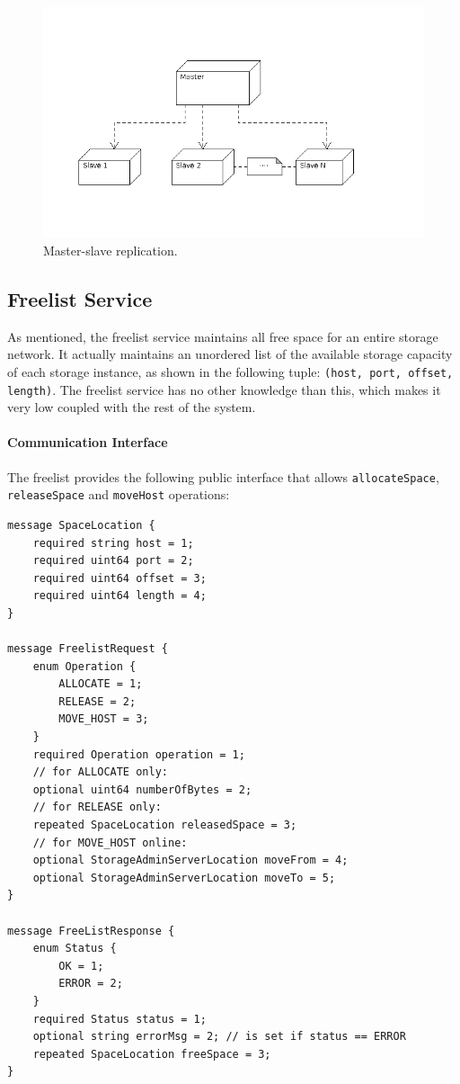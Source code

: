 \documentclass[12pt,a4paper]{scrartcl}
\begin{document}
\begin{figure}[H]
\centering
\includegraphics[width=\textwidth,trim=0 2cm 3cm 1cm,clip=true]{diagrams/MasterSlave.png} %
\caption{Master-slave replication.}
\label{fig:master-slave}
\end{figure}



\subsection{Freelist Service}
\label{sec:freelist}
As mentioned, the freelist service maintains all free space for an entire storage network. It actually maintains an unordered list of the available storage capacity of each storage instance, as shown in the following tuple: \verb|(host, port, offset, length)|. The freelist service has no other knowledge than this, which makes it very low coupled with the rest of the system.

\paragraph{Communication Interface}
The freelist provides the following public interface that allows \verb|allocateSpace|, \verb|releaseSpace| and \verb|moveHost| operations:
\begin{verbatim}
message SpaceLocation {
    required string host = 1;
    required uint64 port = 2;
    required uint64 offset = 3;
    required uint64 length = 4;
}

message FreelistRequest {
    enum Operation {
        ALLOCATE = 1;
        RELEASE = 2;
        MOVE_HOST = 3;
    }
    required Operation operation = 1;
    // for ALLOCATE only:
    optional uint64 numberOfBytes = 2;
    // for RELEASE only:
    repeated SpaceLocation releasedSpace = 3;
    // for MOVE_HOST online:
    optional StorageAdminServerLocation moveFrom = 4;
    optional StorageAdminServerLocation moveTo = 5;
}

message FreeListResponse {
    enum Status {
        OK = 1;
        ERROR = 2;
    }
    required Status status = 1;
    optional string errorMsg = 2; // is set if status == ERROR
    repeated SpaceLocation freeSpace = 3;
}
\end{verbatim}
\end{document}
